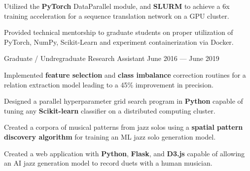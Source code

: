 \begin{cventries}
{\begin{cvitems}
        \item Utilized the \textbf{PyTorch} DataParallel module, and \textbf{SLURM} to achieve a 6x training acceleration for a sequence translation network on a GPU cluster.
        \item Provided technical mentorship to graduate students on proper utilization of PyTorch, NumPy, Scikit-Learn and experiment containerization via Docker.
      \end{cvitems}
    }
    \vspace{.07cm}
  \cventry
    {Graduate / Undregraduate Research Assistant} %
    {} %
    {} %
    {June 2016 --- June 2019} %
    {
      \vspace{-0.1cm}
      \begin{cvitems} %
        \item Implemented \textbf{feature selection} and \textbf{class imbalance} correction routines for a relation extraction model leading to a 45\% improvement in precision.
        \item Designed a parallel hyperparameter grid search program in \textbf{Python} capable of tuning any \textbf{Scikit-learn} classifier on a distributed computing cluster.
        \item Created a corpora of musical patterns from jazz solos using a \textbf{spatial pattern discovery algorithm} for training an ML jazz solo generation model.
        \item Created a web application with \textbf{Python}, \textbf{Flask}, and \textbf{D3.js} capable of allowing an AI jazz generation model to record duets with a human musician.
      \end{cvitems}
    }
    \vspace{.07cm}

\end{cventries}

